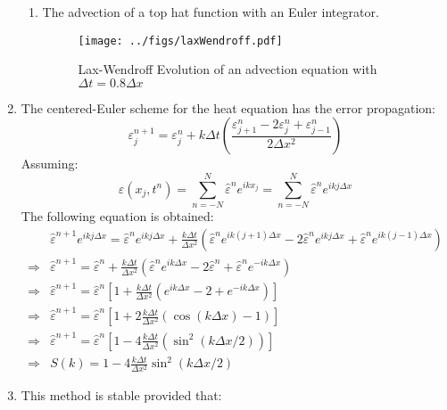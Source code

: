 \documentclass[12pt,a4]{article}
\begin{document}
\begin{enumerate}
\begin{enumerate}
      \item
        The advection of a top hat function with an Euler integrator.
        \begin{figure}[H]
          \centering
          \texttt{[image: ../figs/laxWendroff.pdf]}
          \caption{Lax-Wendroff Evolution of an advection equation with $\Delta t = 0.8 \Delta x$}
        \end{figure}
    \end{enumerate}
  \item
    The centered-Euler scheme for the heat equation has the error propagation:
    \begin{equation*}
      \varepsilon^{n+1}_j = \varepsilon^n_j + k \Delta t \left(\frac{\varepsilon^n_{j + 1} - 2 \varepsilon^n_j + \varepsilon^n_{j - 1}}{2 \Delta x^2 }\right) 
    \end{equation*}
    Assuming:
    \begin{equation*}
        \varepsilon (x_j, t^n) = \sum_{n = -N}^N \hat \varepsilon^n e^{ikx_j} = \sum_{n = -N}^N \hat \varepsilon^n e^{ikj \Delta x}
    \end{equation*}
    The following equation is obtained:
    \begin{align*}
                  & \hat \varepsilon^{n + 1}e^{i k j\Delta x} = \hat \varepsilon^ne^{ikj\Delta x} + \frac{k \Delta t}{\Delta x^2} \left(\hat \varepsilon^ne^{ik(j + 1 )\Delta x} - 2 \hat \varepsilon^ne^{ikj\Delta x} + \hat \varepsilon^ne^{ik(j - 1 )\Delta x}\right)\\
      \Rightarrow & \hat \varepsilon^{n + 1} = \hat \varepsilon^n + \frac{k \Delta t}{\Delta x^2} \left(\hat \varepsilon^ne^{ik\Delta x} - 2 \hat \varepsilon^n + \hat \varepsilon^ne^{-ik\Delta x}\right)\\
      \Rightarrow & \hat \varepsilon^{n + 1} = \hat \varepsilon^n \left[ 1 + \frac{k \Delta t}{\Delta x^2} \left(e^{ik\Delta x} - 2 + e^{-ik\Delta x}\right)\right]\\
      \Rightarrow & \hat \varepsilon^{n + 1} = \hat \varepsilon^n \left[ 1 + 2\frac{k \Delta t}{\Delta x^2} \left(\cos(k\Delta x) - 1\right)\right]\\
      \Rightarrow & \hat \varepsilon^{n + 1} = \hat \varepsilon^n \left[ 1 - 4\frac{k \Delta t}{\Delta x^2} \left(\sin^2(k\Delta x / 2) \right)\right]\\
      \Rightarrow & S(k) = 1 - 4\frac{k \Delta t}{\Delta x^2} \sin^2(k\Delta x / 2)
    \end{align*}
  \item
    This method is stable provided that:

\end{enumerate}
\end{document}
